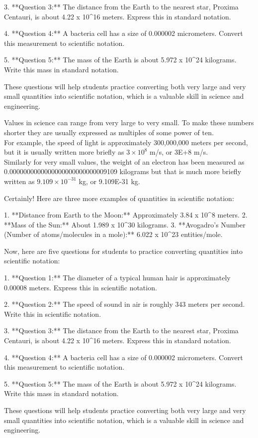 \documentclass{article}
\begin{document}
3. **Question 3:** The distance from the Earth to the nearest star, Proxima Centauri, is about 4.22 x 10^16 meters. Express this in standard notation.

4. **Question 4:** A bacteria cell has a size of 0.000002 micrometers. Convert this measurement to scientific notation.

5. **Question 5:** The mass of the Earth is about 5.972 x 10^24 kilograms. Write this mass in standard notation.

These questions will help students practice converting both very large and very small quantities into scientific notation, which is a valuable skill in science and engineering.


Values in science can range from very large to very small. To make these numbers shorter they are usually expressed as multiples of some power of ten.\\

For example, the speed of light is approximately 300,000,000 meters per second, but it is usually written more briefly as $3\times10^8$ m/s, or 3E+8 m/s.\\

Similarly for very small values, the weight of an electron has been measured as\\0.0000000000000000000000000009109 kilograms but that is much more briefly written as $9.109\times10^{-31}$ kg, or 9.109E-31 kg.

Certainly! Here are three more examples of quantities in scientific notation:

1. **Distance from Earth to the Moon:** Approximately 3.84 x 10^8 meters.
2. **Mass of the Sun:** About 1.989 x 10^30 kilograms.
3. **Avogadro's Number (Number of atoms/molecules in a mole):** 6.022 x 10^23 entities/mole.

Now, here are five questions for students to practice converting quantities into scientific notation:

1. **Question 1:** The diameter of a typical human hair is approximately 0.00008 meters. Express this in scientific notation.

2. **Question 2:** The speed of sound in air is roughly 343 meters per second. Write this in scientific notation.

3. **Question 3:** The distance from the Earth to the nearest star, Proxima Centauri, is about 4.22 x 10^16 meters. Express this in standard notation.

4. **Question 4:** A bacteria cell has a size of 0.000002 micrometers. Convert this measurement to scientific notation.

5. **Question 5:** The mass of the Earth is about 5.972 x 10^24 kilograms. Write this mass in standard notation.

These questions will help students practice converting both very large and very small quantities into scientific notation, which is a valuable skill in science and engineering.
\end{document}
